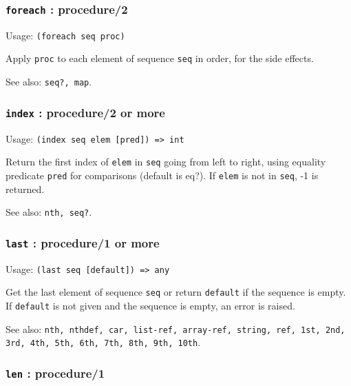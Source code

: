 \documentclass[
]{article}
\newcommand{\passthrough}[1]{#1}
\begin{document}
\hypertarget{foreach-procedure2}{%
\subsubsection{\texorpdfstring{\texttt{foreach} :
procedure/2}{foreach : procedure/2}}\label{foreach-procedure2}}

Usage: \passthrough{\lstinline!(foreach seq proc)!}

Apply \passthrough{\lstinline!proc!} to each element of sequence
\passthrough{\lstinline!seq!} in order, for the side effects.

See also: \passthrough{\lstinline!seq?, map!}.

\hypertarget{index-procedure2-or-more}{%
\subsubsection{\texorpdfstring{\texttt{index} : procedure/2 or
more}{index : procedure/2 or more}}\label{index-procedure2-or-more}}

Usage: \passthrough{\lstinline!(index seq elem [pred]) => int!}

Return the first index of \passthrough{\lstinline!elem!} in
\passthrough{\lstinline!seq!} going from left to right, using equality
predicate \passthrough{\lstinline!pred!} for comparisons (default is
eq?). If \passthrough{\lstinline!elem!} is not in
\passthrough{\lstinline!seq!}, -1 is returned.

See also: \passthrough{\lstinline!nth, seq?!}.

\hypertarget{last-procedure1-or-more}{%
\subsubsection{\texorpdfstring{\texttt{last} : procedure/1 or
more}{last : procedure/1 or more}}\label{last-procedure1-or-more}}

Usage: \passthrough{\lstinline!(last seq [default]) => any!}

Get the last element of sequence \passthrough{\lstinline!seq!} or return
\passthrough{\lstinline!default!} if the sequence is empty. If
\passthrough{\lstinline!default!} is not given and the sequence is
empty, an error is raised.

See also:
\passthrough{\lstinline!nth, nthdef, car, list-ref, array-ref, string, ref, 1st, 2nd, 3rd, 4th, 5th, 6th, 7th, 8th, 9th, 10th!}.

\hypertarget{len-procedure1}{%
\subsubsection{\texorpdfstring{\texttt{len} :
procedure/1}{len : procedure/1}}\label{len-procedure1}}
\end{document}
